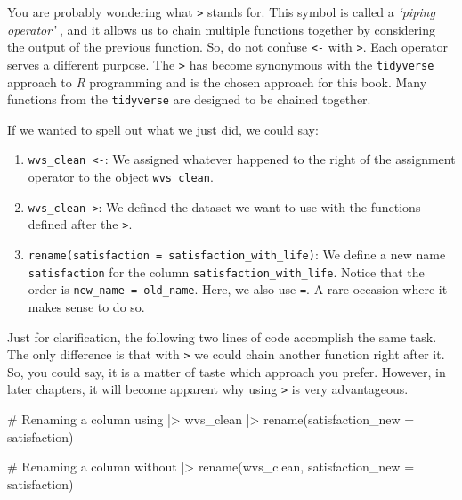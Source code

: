 \documentclass[
  letterpaper,
  DIV=11,
  numbers=noendperiod]{scrreprt}
\newenvironment{Shaded}{\begin{snugshade}}{\end{snugshade}}
\newcommand{\AttributeTok}[1]{\textcolor[rgb]{0.40,0.45,0.13}{#1}}
\newcommand{\CommentTok}[1]{\textcolor[rgb]{0.37,0.37,0.37}{#1}}
\newcommand{\FunctionTok}[1]{\textcolor[rgb]{0.28,0.35,0.67}{#1}}
\newcommand{\NormalTok}[1]{\textcolor[rgb]{0.00,0.23,0.31}{#1}}
\newcommand{\SpecialCharTok}[1]{\textcolor[rgb]{0.37,0.37,0.37}{#1}}
\begin{document}
You are probably wondering what \texttt{\textbar{}\textgreater{}} stands
for. This symbol is called a \emph{`piping operator'} , and it allows us
to chain multiple functions together by considering the output of the
previous function. So, do not confuse \texttt{\textless{}-} with
\texttt{\textbar{}\textgreater{}}. Each operator serves a different
purpose. The \texttt{\textbar{}\textgreater{}} has become synonymous
with the \texttt{tidyverse} approach to \emph{R} programming and is the
chosen approach for this book. Many functions from the
\texttt{tidyverse} are designed to be chained together.

If we wanted to spell out what we just did, we could say:

\begin{enumerate}
\def\labelenumi{\arabic{enumi}.}
\item
  \texttt{wvs\_clean\ \textless{}-}: We assigned whatever happened to
  the right of the assignment operator to the object
  \texttt{wvs\_clean}.
\item
  \texttt{wvs\_clean\ \textbar{}\textgreater{}}: We defined the dataset
  we want to use with the functions defined after the
  \texttt{\textbar{}\textgreater{}}.
\item
  \texttt{rename(satisfaction\ =\ satisfaction\_with\_life)}: We define
  a new name \texttt{satisfaction} for the column
  \texttt{satisfaction\_with\_life}. Notice that the order is
  \texttt{new\_name\ =\ old\_name}. Here, we also use \texttt{=}. A rare
  occasion where it makes sense to do so.
\end{enumerate}

Just for clarification, the following two lines of code accomplish the
same task. The only difference is that with
\texttt{\textbar{}\textgreater{}} we could chain another function right
after it. So, you could say, it is a matter of taste which approach you
prefer. However, in later chapters, it will become apparent why using
\texttt{\textbar{}\textgreater{}} is very advantageous.

\begin{Shaded}
\begin{Highlighting}[]
\CommentTok{\# Renaming a column using \textquotesingle{}|\textgreater{}\textquotesingle{}}
\NormalTok{wvs\_clean }\SpecialCharTok{|\textgreater{}} \FunctionTok{rename}\NormalTok{(}\AttributeTok{satisfaction\_new =}\NormalTok{ satisfaction)}

\CommentTok{\# Renaming a column without \textquotesingle{}|\textgreater{}\textquotesingle{}}
\FunctionTok{rename}\NormalTok{(wvs\_clean, }\AttributeTok{satisfaction\_new =}\NormalTok{ satisfaction)}
\end{Highlighting}
\end{Shaded}
\end{document}

